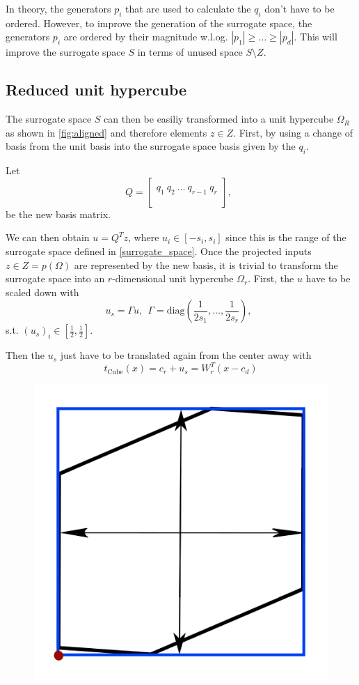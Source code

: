 \documentclass[
  a4paper,  %
  twoside,  %
  bibliography=totoc,
  headsepline,
  cleardoublepage=empty,
  parskip=half,
  draft=false
]{scrbook}
\begin{document}
In theory, the generators $p_i$ that are used to calculate the $q_i$ don't have to be ordered.
However, to improve the generation of the surrogate space, the generators $p_i$ are ordered by their magnitude w.l.og. $|p_1|\geq \dots \geq |p_d|$.
This will improve the surrogate space $S$ in terms of unused space $S \setminus Z$.


\subsection{Reduced unit hypercube}

The surrogate space $S$ can then be easiliy transformed into a unit hypercube $\Omega_R$ as shown in \ref{fig:aligned} and therefore elements $z \in Z$.
First, by using a change of basis from the unit basis into the surrogate space basis given by the $q_i$.

Let
\begin{equation}
Q=\begin{bmatrix}
  \\
    q_1 ~ q_2 ~ \dots ~q_{r-1} ~ q_r\\
    \\
  \end{bmatrix}
  , ~~
\label{alignment}
\end{equation}
be the new basis matrix.

We can then obtain $u=Q^T z$, where $u_i \in [-s_i,s_i]$ since this is the range of the surrogate space defined in \ref{surrogate_space}.
Once the projected inputs $z \in Z=p(\Omega)$ are represented by the new basis, it is trivial to transform the surrogate space into an $r$-dimensional unit hypercube $\Omega_r$.
First, the $u$ have to be scaled down with
\begin{equation}
u_s=\Gamma u, ~~ \Gamma=\text{diag}(\frac{1}{2 s_1}, \dots, \frac{1}{2 s_r}), ~~
\label{alignment}
\end{equation}
s.t. $(u_s)_i \in [\frac{1}{2},\frac{1}{2}]$.

Then the $u_s$ just have to be translated again from the center away with
\begin{equation}
t_{\text{Cube}}(x)=c_r + u_s = W_r^T (x-c_d)
\end{equation}

\begin{figure}[H]
\centering
  \includegraphics[width=0.4\linewidth]{graphics/s_unit}
  \label{fig:f2_combined_rel_errors_inter}
\end{figure}
\end{document}
